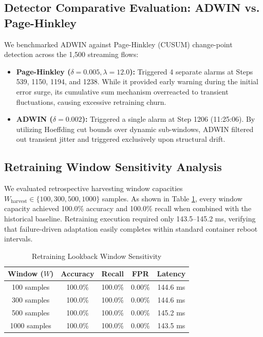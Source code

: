 \documentclass[conference]{IEEEtran}
\begin{document}
\subsection{Detector Comparative Evaluation: ADWIN vs. Page-Hinkley}
We benchmarked ADWIN against Page-Hinkley (CUSUM) change-point detection across the 1,500 streaming flows:
\begin{itemize}
    \item \textbf{Page-Hinkley ($\delta=0.005, \lambda=12.0$):} Triggered 4 separate alarms at Steps 539, 1150, 1194, and 1238. While it provided early warning during the initial error surge, its cumulative sum mechanism overreacted to transient fluctuations, causing excessive retraining churn.
    \item \textbf{ADWIN ($\delta=0.002$):} Triggered a single alarm at Step 1206 (11:25:06). By utilizing Hoeffding cut bounds over dynamic sub-windows, ADWIN filtered out transient jitter and triggered exclusively upon structural drift.
\end{itemize}

\subsection{Retraining Window Sensitivity Analysis}
We evaluated retrospective harvesting window capacities $W_{\text{harvest}} \in \{100, 300, 500, 1000\}$ samples. As shown in Table \ref{tab:window_sens}, every window capacity achieved 100.0\% accuracy and 100.0\% recall when combined with the historical baseline. Retraining execution required only 143.5--145.2 ms, verifying that failure-driven adaptation easily completes within standard container reboot intervals.

\begin{table}[htbp]
\caption{Retraining Lookback Window Sensitivity}
\begin{center}
\begin{tabular}{ccccc}
\toprule
\textbf{Window ($W$)} & \textbf{Accuracy} & \textbf{Recall} & \textbf{FPR} & \textbf{Latency} \\
\midrule
100 samples  & 100.0\% & 100.0\% & 0.00\% & 144.6 ms \\
300 samples  & 100.0\% & 100.0\% & 0.00\% & 144.6 ms \\
500 samples  & 100.0\% & 100.0\% & 0.00\% & 145.2 ms \\
1000 samples & 100.0\% & 100.0\% & 0.00\% & 143.5 ms \\
\bottomrule
\end{tabular}
\label{tab:window_sens}
\end{center}
\end{table}
\end{document}
